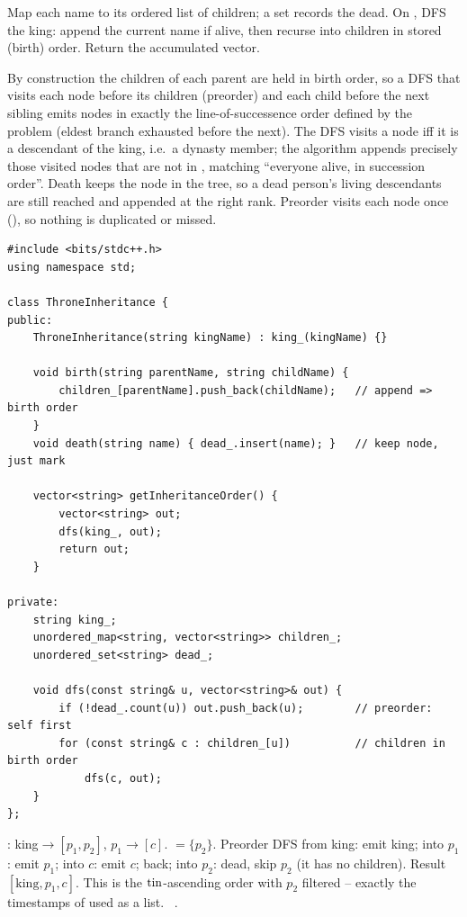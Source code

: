 Map each name to its ordered list of children; a set records the dead. On
, DFS the king: append the current name if alive, then recurse into
children in stored (birth) order. Return the accumulated vector.

\begin{proofbox}
By construction the children of each parent are held in birth order, so a DFS that visits
each node before its children (preorder) and each child before the next sibling emits nodes
in exactly the line-of-successence order defined by the problem (eldest branch exhausted
before the next). The DFS visits a node iff it is a descendant of the king, i.e.\ a dynasty
member; the algorithm appends precisely those visited nodes that are not in ,
matching ``everyone alive, in succession order''. Death keeps the node in the tree, so a dead
person's living descendants are still reached and appended at the right rank. Preorder visits
each node once (), so nothing is duplicated or missed.
\end{proofbox}

\begin{lstlisting}[caption={Throne Inheritance via ordered children + preorder DFS (LeetCode 1600)}, label={lst:c24-throne}]
#include <bits/stdc++.h>
using namespace std;

class ThroneInheritance {
public:
    ThroneInheritance(string kingName) : king_(kingName) {}

    void birth(string parentName, string childName) {
        children_[parentName].push_back(childName);   // append => birth order
    }
    void death(string name) { dead_.insert(name); }   // keep node, just mark

    vector<string> getInheritanceOrder() {
        vector<string> out;
        dfs(king_, out);
        return out;
    }

private:
    string king_;
    unordered_map<string, vector<string>> children_;
    unordered_set<string> dead_;

    void dfs(const string& u, vector<string>& out) {
        if (!dead_.count(u)) out.push_back(u);        // preorder: self first
        for (const string& c : children_[u])          // children in birth order
            dfs(c, out);
    }
};
\end{lstlisting}

\begin{tracebox}
: king$\to[p_1,p_2]$, $p_1\to[c]$. $=\{p_2\}$.
Preorder DFS from king: emit king; into $p_1$: emit $p_1$; into $c$: emit $c$; back; into
$p_2$: dead, skip $p_2$ (it has no children). Result $[\text{king}, p_1, c]$. This is the
$\operatorname{tin}$-ascending order with $p_2$ filtered -- exactly the timestamps of 
used as a list. \checkmark\ .
\end{tracebox}

